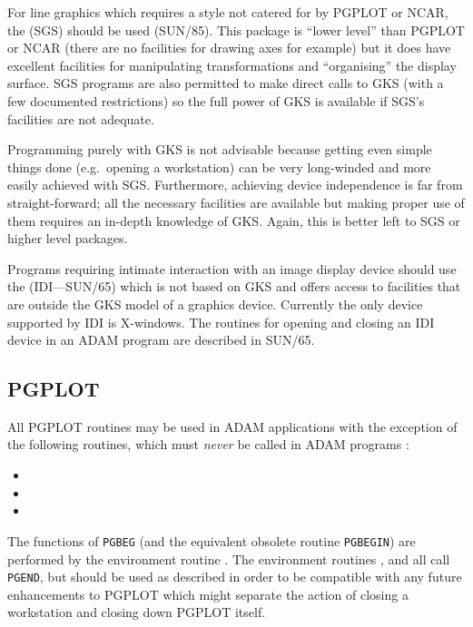 \documentclass[twoside,11pt,nolof]{starlink}
\begin{document}
For line graphics which requires a style not catered for by PGPLOT or NCAR, the
(SGS) should be used (SUN/85). This package is ``lower
level'' than PGPLOT or NCAR (there are no facilities for drawing axes for
example) but it does have excellent facilities for manipulating transformations
and ``organising'' the display surface. SGS programs are also permitted to make
direct calls to GKS (with a few documented restrictions) so the full power of
GKS is available if SGS's facilities are not adequate.

Programming purely with GKS is not advisable because getting even simple things
done (e.g.\ opening a workstation) can be very long-winded and more easily
achieved with SGS. Furthermore, achieving device independence is far from
straight-forward; all the necessary facilities are available but making proper
use of them requires an in-depth knowledge of GKS. Again, this is better left
to SGS or higher level packages.

Programs requiring intimate interaction with an image display device should use
the 
(IDI---SUN/65) which is not based on GKS and offers
access to facilities that are outside the GKS model of a graphics device.
Currently the only device supported by IDI is
X-windows. The routines for opening and closing an IDI device in an
ADAM program are described in SUN/65.


\subsection{PGPLOT}

All PGPLOT routines may be used in ADAM applications with the exception of the
following routines, which must \emph{never} be called in ADAM programs :
\begin{itemize}
\item {}
\item {}
\item {}
\end{itemize}
The functions of \texttt{PGBEG} (and the equivalent obsolete routine \texttt{PGBEGIN}) are performed by the environment routine
. The
environment routines ,
 and
 all call \texttt{PGEND},
but should be used as
described  in order to be compatible
with any future
enhancements to PGPLOT which might separate the action of closing a
workstation and closing down PGPLOT itself.
\end{document}
